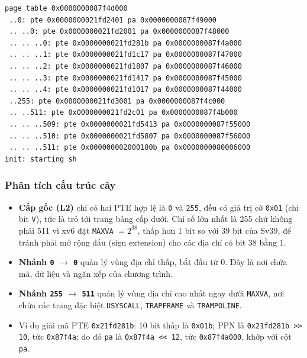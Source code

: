 \begin{center}
\begin{minipage}{0.95\textwidth}
\begin{lstlisting}[numbers=none,xleftmargin=0pt,framexleftmargin=0pt]
page table 0x0000000087f4d000
 ..0: pte 0x0000000021fd2401 pa 0x0000000087f49000
 .. ..0: pte 0x0000000021fd2001 pa 0x0000000087f48000
 .. .. ..0: pte 0x0000000021fd281b pa 0x0000000087f4a000
 .. .. ..1: pte 0x0000000021fd1c17 pa 0x0000000087f47000
 .. .. ..2: pte 0x0000000021fd1807 pa 0x0000000087f46000
 .. .. ..3: pte 0x0000000021fd1417 pa 0x0000000087f45000
 .. .. ..4: pte 0x0000000021fd1017 pa 0x0000000087f44000
 ..255: pte 0x0000000021fd3001 pa 0x0000000087f4c000
 .. ..511: pte 0x0000000021fd2c01 pa 0x0000000087f4b000
 .. .. ..509: pte 0x0000000021fd5413 pa 0x0000000087f55000
 .. .. ..510: pte 0x0000000021fd5807 pa 0x0000000087f56000
 .. .. ..511: pte 0x000000002000180b pa 0x0000000080006000
init: starting sh
\end{lstlisting}
\end{minipage}
\end{center}

\subsubsection{Phân tích cấu trúc cây}
\begin{itemize}
    \item \textbf{Cấp gốc (L2)} chỉ có hai PTE hợp lệ là \texttt{0} và \texttt{255}, đều có giá trị cờ \texttt{0x01} (chỉ bit \texttt{V}), tức là trỏ tới trang bảng cấp dưới. Chỉ số lớn nhất là 255 chứ không phải 511 vì xv6 đặt \texttt{MAXVA} $= 2^{38}$, thấp hơn 1 bit so với 39 bit của Sv39, để tránh phải mở rộng dấu (sign extension) cho các địa chỉ có bit 38 bằng 1.
    \item \textbf{Nhánh \texttt{0} $\to$ \texttt{0}} quản lý vùng địa chỉ thấp, bắt đầu từ 0. Đây là nơi chứa mã, dữ liệu và ngăn xếp của chương trình.
    \item \textbf{Nhánh \texttt{255} $\to$ \texttt{511}} quản lý vùng địa chỉ cao nhất ngay dưới \texttt{MAXVA}, nơi chứa các trang đặc biệt \texttt{USYSCALL}, \texttt{TRAPFRAME} và \texttt{TRAMPOLINE}.
    \item Ví dụ giải mã PTE \texttt{0x21fd281b}: 10 bit thấp là \texttt{0x01b}; PPN là \texttt{0x21fd281b >> 10}, tức \texttt{0x87f4a}; do đó \texttt{pa} là \texttt{0x87f4a << 12}, tức \texttt{0x87f4a000}, khớp với cột \texttt{pa}.
\end{itemize}

